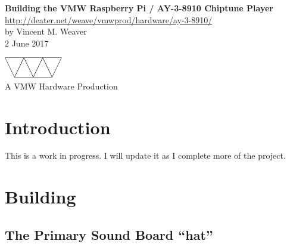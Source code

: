 \documentclass[11pt]{article}
\begin{document}
\begin{center}
{\Large \bf Building the VMW Raspberry Pi / AY-3-8910 Chiptune Player}\\
\url{http://deater.net/weave/vmwprod/hardware/ay-3-8910/}\\
by Vincent M. Weaver\\
2 June 2017
\end{center}

\begin{center}
\includegraphics[width=1in]{figs/vmw}\\
A VMW Hardware Production
\end{center}

\section{Introduction}

This is a work in progress.  I will update it as I complete more
of the project.

\section{Building}

\subsection{The Primary Sound Board ``hat''}
\end{document}
